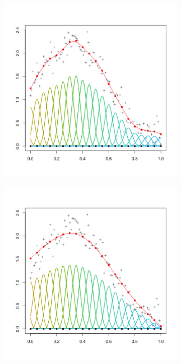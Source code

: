 \documentclass[12pt]{article}
\begin{document}
\begin{figure}[H]
\begin{subfigure}{.5\textwidth}
  \includegraphics[scale=0.5]{pspline_pord2_small_lambda.png}
  \label{fig:pspline_small_lambda}
\end{subfigure}
\begin{subfigure}{.5\textwidth}
  \centering
   \graphicspath{{img/}}
  \includegraphics[scale=0.5]{pspline_pord2_medium_lambda.png}

\end{subfigure}
\end{figure}
\end{document}
